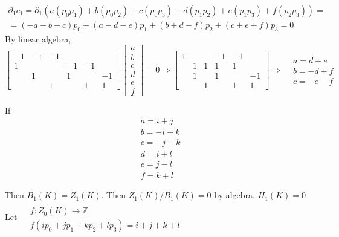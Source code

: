 \documentclass[twoside]{amsart}
\begin{document}
\[
\begin{gathered}
  \partial_1 c_1 = \partial_1 (a(p_0p_1) + b(p_0p_2) + c(p_0p_3) + d(p_1p_2) + e(p_1p_3) + f(p_2p_3)) = \\
  = (-a-b-c) p_0 + (a-d-e) p_1 + (b+d-f) p_2 + (c+e+f) p_3 = 0 
\end{gathered}
\]
By linear algebra,
\[
\left[ \begin{matrix} -1 & - 1 & -1 &  & & \\ 
    1 & & & -1 & -1 & \\
    & 1 & & 1 & & -1 \\ 
    & & 1 &  & 1 & 1 \end{matrix} \right] \left[ \begin{matrix} a \\ b \\ c \\ d \\ e \\ f \end{matrix} \right] = 0 \Longrightarrow \left[ \begin{matrix} 1 & & & -1 & -1 & \\ 
    & 1 & 1 & 1 & 1 &  \\
    & 1 & & 1 & & -1 \\ 
    & & 1 & & 1 & 1 \end{matrix} \right] \Longrightarrow \begin{aligned} & a = d + e \\ 
  & b = -d + f \\ 
  & c = -e -f \end{aligned}
\]

If 
\[
\begin{aligned}
  & a = i + j \\ 
  & b = -i + k \\ 
  & c = -j -k \\ 
  & d = i + l \\
  & e = j - l \\
  & f = k + l 
\end{aligned}
\]

Then $B_1(K) = Z_1(K)$.  Then $Z_1(K)/B_1(K) = 0$ by algebra.  $\boxed{ H_1(K) = 0 }$ \\

Let $\begin{aligned} & \quad \\ 
  & f: Z_0(K) \to \mathbb{Z}  \\
  & f(ip_0 + jp_1 + k p_2 + l p_3) = i + j +k + l \end{aligned}$ \\
\end{document}
